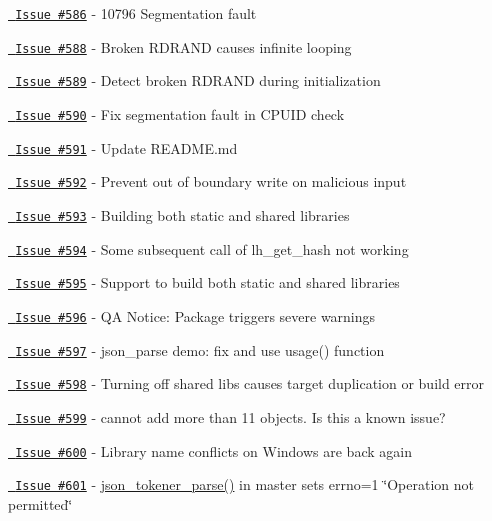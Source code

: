 \begin{DoxyItemize}
\item \href{https://github.com/json-c/json-c/issues/586}{\texttt{ Issue \#586}} -\/ 10796 Segmentation fault
\item \href{https://github.com/json-c/json-c/issues/588}{\texttt{ Issue \#588}} -\/ Broken RDRAND causes infinite looping
\item \href{https://github.com/json-c/json-c/issues/589}{\texttt{ Issue \#589}} -\/ Detect broken RDRAND during initialization
\item \href{https://github.com/json-c/json-c/issues/590}{\texttt{ Issue \#590}} -\/ Fix segmentation fault in CPUID check
\item \href{https://github.com/json-c/json-c/issues/591}{\texttt{ Issue \#591}} -\/ Update README.\+md
\item \href{https://github.com/json-c/json-c/issues/592}{\texttt{ Issue \#592}} -\/ Prevent out of boundary write on malicious input
\item \href{https://github.com/json-c/json-c/issues/593}{\texttt{ Issue \#593}} -\/ Building both static and shared libraries
\item \href{https://github.com/json-c/json-c/issues/594}{\texttt{ Issue \#594}} -\/ Some subsequent call of lh\+\_\+get\+\_\+hash not working
\item \href{https://github.com/json-c/json-c/issues/595}{\texttt{ Issue \#595}} -\/ Support to build both static and shared libraries
\item \href{https://github.com/json-c/json-c/issues/596}{\texttt{ Issue \#596}} -\/ QA Notice\+: Package triggers severe warnings
\item \href{https://github.com/json-c/json-c/issues/597}{\texttt{ Issue \#597}} -\/ json\+\_\+parse demo\+: fix and use usage() function
\item \href{https://github.com/json-c/json-c/issues/598}{\texttt{ Issue \#598}} -\/ Turning off shared libs causes target duplication or build error
\item \href{https://github.com/json-c/json-c/issues/599}{\texttt{ Issue \#599}} -\/ cannot add more than 11 objects. Is this a known issue?
\item \href{https://github.com/json-c/json-c/issues/600}{\texttt{ Issue \#600}} -\/ Library name conflicts on Windows are back again
\item \href{https://github.com/json-c/json-c/issues/601}{\texttt{ Issue \#601}} -\/ \mbox{\hyperlink{json__tokener_8h_a236ef64d079822a4411d13eae7190c4d}{json\+\_\+tokener\+\_\+parse()}} in master sets errno=1 \char`\"{}\+Operation not permitted\char`\"{}

\end{DoxyItemize}
